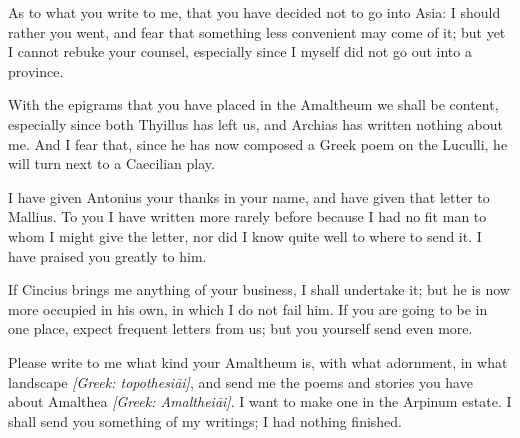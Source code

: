  As to what you write to me, that you have decided not to go into Asia: I should rather you went, and fear that something less convenient may come of it; but yet I cannot rebuke your counsel, especially since I myself did not go out into a province.

 With the epigrams that you have placed in the Amaltheum we shall be content, especially since both Thyillus has left us, and Archias has written nothing about me. And I fear that, since he has now composed a Greek poem on the Luculli, he will turn next to a Caecilian play.

 I have given Antonius your thanks in your name, and have given that letter to Mallius. To you I have written more rarely before because I had no fit man to whom I might give the letter, nor did I know quite well to where to send it. I have praised you greatly to him.

 If Cincius brings me anything of your business, I shall undertake it; but he is now more occupied in his own, in which I do not fail him. If you are going to be in one place, expect frequent letters from us; but you yourself send even more.

 Please write to me what kind your Amaltheum is, with what adornment, in what landscape \textit{[Greek: topothesi\=ai]}, and send me the poems and stories you have about Amalthea \textit{[Greek: Amalthei\=ai]}. I want to make one in the Arpinum estate. I shall send you something of my writings; I had nothing finished.
